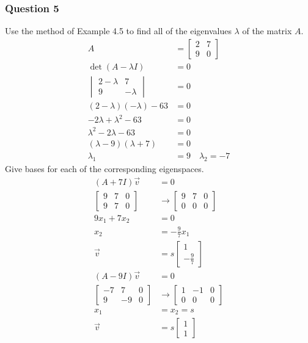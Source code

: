 \documentclass{math}
\begin{document}
\subsubsection*{Question 5}
Use the method of Example 4.5 to find all of the eigenvalues \( \lambda \) of
the matrix \( A \).
\begin{align*}
  A &= \begin{bmatrix}
    2 & 7 \\
    9 & 0
  \end{bmatrix} \\
  \det(A-\lambda I) &= 0 \\
  \begin{vmatrix}
    2-\lambda & 7 \\
    9 & -\lambda
  \end{vmatrix} &= 0 \\
  (2-\lambda)(-\lambda)-63 &= 0 \\
  -2\lambda+\lambda^2-63 &= 0 \\
  \lambda^2-2\lambda-63 &= 0 \\
  (\lambda-9)(\lambda+7) &= 0 \\
  \lambda_1 &= 9 \quad \lambda_2 = -7
\end{align*}
Give bases for each of the corresponding eigenspaces.
\begin{align*}
  (A+7I)\vec{v} &= 0 \\
  \begin{bmatrix}
    9 & 7 & 0 \\
    9 & 7 & 0
  \end{bmatrix} &\to \begin{bmatrix}
    9 & 7 & 0 \\
    0 & 0 & 0
  \end{bmatrix} \\
  9x_1+7x_2 &= 0 \\
  x_2 &= -\frac{9}{7}x_1 \\
  \vec{v} &= s\begin{bmatrix}1 \\ -\frac{9}{7}\end{bmatrix} \\
  (A-9I)\vec{v} &= 0 \\
  \begin{bmatrix}
    -7 & 7 & 0 \\
    9 & -9 & 0
  \end{bmatrix} &\to \begin{bmatrix}
    1 & -1 & 0 \\
    0 & 0 & 0
  \end{bmatrix} \\
  x_1 &= x_2 = s \\
  \vec{v} &= s\begin{bmatrix}1 \\ 1\end{bmatrix}
\end{align*}
\end{document}
